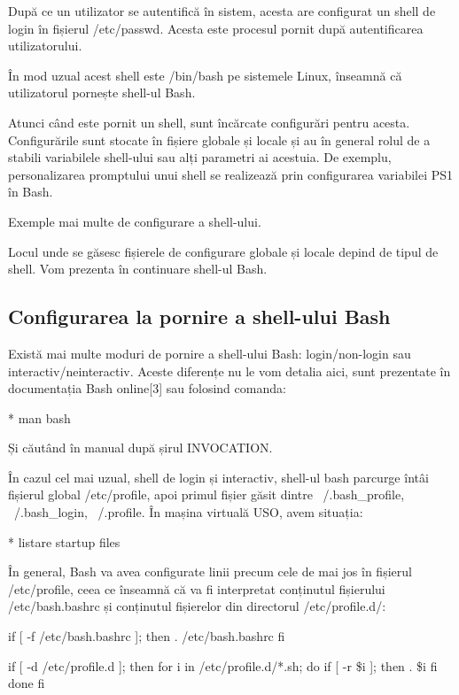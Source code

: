 După ce un utilizator se autentifică în sistem, acesta are configurat un shell
de login în fișierul /etc/passwd. Acesta este procesul pornit după
autentificarea utilizatorului.

În mod uzual acest shell este /bin/bash pe sistemele Linux, înseamnă că
utilizatorul pornește shell-ul Bash.

Atunci când este pornit un shell, sunt încărcate configurări pentru acesta.
Configurările sunt stocate în fișiere globale și locale și au în general rolul
de a stabili variabilele shell-ului sau alți parametri ai acestuia. De exemplu,
personalizarea promptului unui shell se realizează prin configurarea variabilei
PS1 în Bash.

Exemple mai multe de configurare a shell-ului.

Locul unde se găsesc fișierele de configurare globale și locale depind de tipul
de shell. Vom prezenta în continuare shell-ul Bash.

\subsection{Configurarea la pornire a shell-ului Bash}
\label{sec:cli-shell-startup}

Există mai multe moduri de pornire a shell-ului Bash: login/non-login sau
interactiv/neinteractiv. Aceste diferențe nu le vom detalia aici, sunt
prezentate în documentația Bash online[3] sau folosind comanda:

* man bash

Și căutând în manual după șirul INVOCATION.

În cazul cel mai uzual, shell de login și interactiv, shell-ul bash parcurge
întâi fișierul global /etc/profile, apoi primul fișier găsit dintre
~/.bash_profile, ~/.bash_login, ~/.profile. În mașina virtuală USO, avem
situația:

* listare startup files

În general, Bash va avea configurate linii precum cele de mai jos în fișierul
/etc/profile, ceea ce înseamnă că va fi interpretat conținutul fișierului
/etc/bash.bashrc și conținutul fișierelor din directorul /etc/profile.d/:

\begin{screen}
        if [ -f /etc/bash.bashrc ]; then
            . /etc/bash.bashrc
        fi


if [ -d /etc/profile.d ]; then
    for i in /etc/profile.d/*.sh; do
        if [ -r \$i ]; then
            . \$i
        fi
    done
fi
\end{screen}


